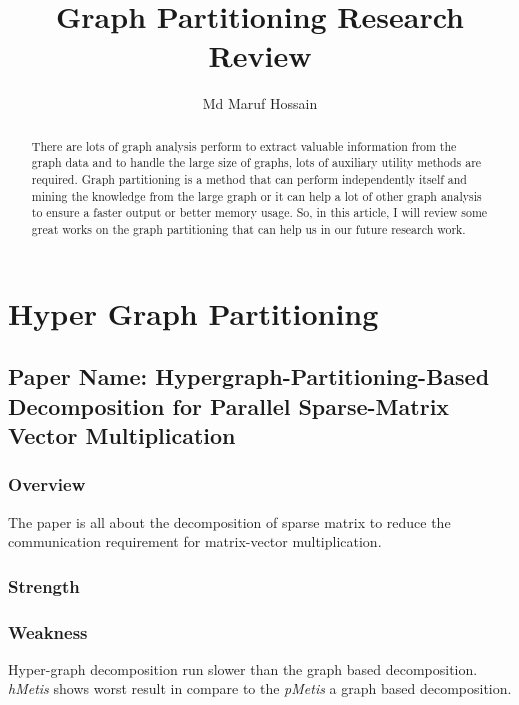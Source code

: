 \documentclass[conference, onecolumn]{IEEEtran}
\begin{document}
\title{Graph Partitioning Research Review}


\author{Md Maruf Hossain}

\maketitle

\begin{abstract}
There are lots of graph analysis perform to extract valuable information from the graph data and to handle the large 
size of graphs, lots of auxiliary utility methods are required. Graph partitioning is a method that can perform 
independently itself and mining the knowledge from the large graph or it can help a lot of other graph analysis to 
ensure a faster output or better memory usage. So, in this article, I will review some great works on the graph partitioning 
that can help us in our future research work.    
\end{abstract}

\section{Hyper Graph Partitioning}
\subsection{Paper Name: Hypergraph-Partitioning-Based Decomposition for Parallel Sparse-Matrix Vector Multiplication} 

\subsubsection{Overview}
The paper is all about the decomposition of sparse matrix to reduce the communication requirement for matrix-vector multiplication. 


\subsubsection{Strength}

\subsubsection{Weakness}
Hyper-graph decomposition run slower than the graph based decomposition. \textit{hMetis} shows worst result in compare to the \textit{pMetis} a 
graph based decomposition.
\end{document}
